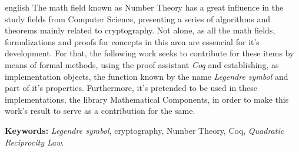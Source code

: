 \begin{resumo}[Abstract]
        \begin{otherlanguage*}{english}
                The math field known as Number Theory has a great influence in the study fields from Computer Science, presenting a series of algorithms and theorems mainly related to cryptography. Not alone, as all the math fields, formalizations and proofs for concepts in this area are essencial for it's development. For that, the following work seeks to contribute for these items by means of formal methods, using the proof assistant \textit{Coq} and establishing, as implementation objects, the function known by the name \textit{Legendre symbol} and part of it's properties. Furthermore, it's pretended to be used in these implementations, the library Mathematical Components, in order to make this work's result to serve as a contribution for the same.
                
                \vspace{\onelineskip}
                
                \noindent
                \textbf{Keywords:} \textit{Legendre symbol}, cryptography, Number Theory, Coq, \textit{Quadratic Reciprocity Law}.
        \end{otherlanguage*}
\end{resumo}